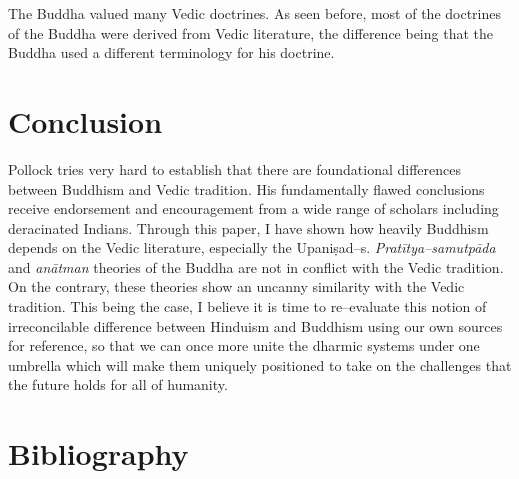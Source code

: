 The Buddha valued many Vedic doctrines. As seen before, most of the doctrines of the Buddha were derived from Vedic literature, the difference being that the Buddha used a different terminology for his doctrine.


\section*{Conclusion}

Pollock tries very hard to establish that there are foundational differences between Buddhism and Vedic tradition. His fundamentally flawed conclusions receive endorsement and encouragement from a wide range of scholars including deracinated Indians. Through this paper, I have shown how heavily Buddhism depends on the Vedic literature, especially the Upaniṣad–s. \textit{Pratītya–samutpāda} and \textit{anātman} theories of the Buddha are not in conflict with the Vedic tradition. On the contrary, these theories show an uncanny similarity with the Vedic tradition. This being the case, I believe it is time to re–evaluate this notion of irreconcilable difference between Hinduism and Buddhism using our own sources for reference, so that we can once more unite the dharmic systems under one umbrella which will make them uniquely positioned to take on the challenges that the future holds for all of humanity.


\section*{Bibliography}

